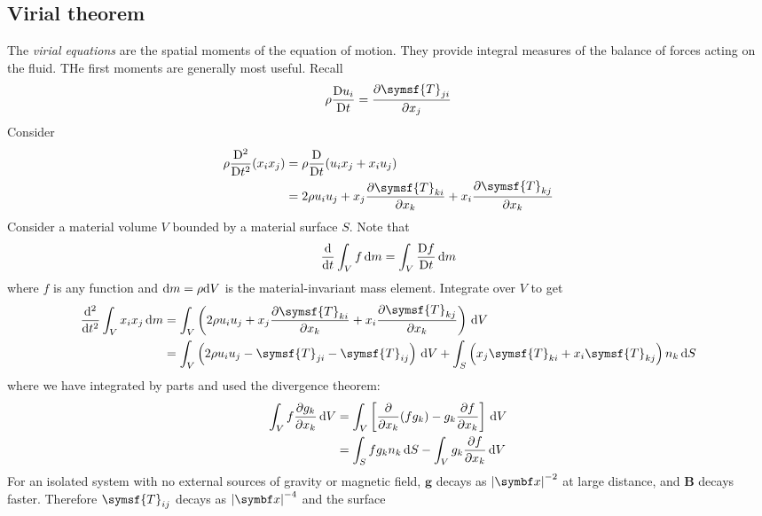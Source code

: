 \documentclass{jknotes}
\newcommand{\B}{\symbf{B}}
\begin{document}
\subsection{Virial theorem}
The \emph{virial equations} are the spatial moments of the equation of motion.
They provide integral measures of the balance of forces acting on the fluid.
THe first moments are generally most useful. Recall
\begin{equation}
	\rho \frac{\diffD u_i}{\diffD t} = \frac{\partial \symsf{T}_{ji}}{\partial
	x_j}
\end{equation}
Consider
\begin{align}
	\rho \frac{\diffD^2}{\diffD t^2} (x_i x_j) &= \rho \frac{\diffD}{\diffD
	t}(u_i x_j + x_i u_j) \\
	&= 2 \rho u_i u_j + x_j \frac{\partial \symsf{T}_{ki}}{\partial x_k} + x_i
	\frac{\partial \symsf{T}_{kj}}{\partial x_k}
\end{align}
Consider a material volume $V$ bounded by a material surface $S$. Note that
\begin{equation}
	\frac{\diffd }{\diffd t} \int_V f \, \diffd m = \int_V \frac{\diffD
	f}{\diffD t} \, \diffd m
\end{equation}
where $f$ is any function and $\diffd m = \rho \diffd V$ is the
material-invariant mass element. Integrate over $V$ to get
\begin{align}
	 \frac{\diffd^2}{\diffd t^2} \int_V x_i x_j\,\diffd m
	 &= \int_V \left(2 \rho u_i u_j + x_j \frac{\partial
	 \symsf{T}_{ki}}{\partial x_k} + x_i \frac{\partial
 	\symsf{T}_{kj}}{\partial x_k}\right) \, \diffd V \\
	 &= \int_V \left( 2 \rho u_i u_j - \symsf{T}_{ji} - \symsf{T}_{ij}\right)
	 \, \diffd V + \int_S \left( x_j \symsf{T}_{ki} + x_i
 	\symsf{T}_{kj}\right)n_k \, \diffd S 
\end{align}
where we have integrated by parts and used the divergence theorem:
\begin{align}
	\int_V f \frac{\partial g_k}{\partial x_k} \, \diffd V 
	&= \int_V \left[
	\frac{\partial}{\partial x_k} (fg_k) - g_k \frac{\partial f}{\partial x_k}
	\right] \, \diffd V \\
	&= \int_S f g_k n_k \, \diffd S - \int_V g_k \frac{\partial f}{\partial
	x_k} \, \diffd V
\end{align}
For an isolated system with no external sources of gravity or magnetic field,
$\symbf{g}$ decays as $\abs{\x}^{-2}$ at large distance, and $\B$ decays
faster. Therefore $\symsf{T}_{ij}$ decays as $\abs{\x}^{-4}$ and the surface
\end{document}
